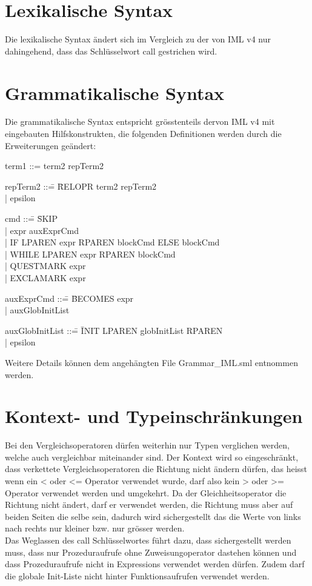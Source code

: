 \documentclass[a4paper,10pt]{article}
\begin{document}
\section{Lexikalische Syntax}
Die lexikalische Syntax \"andert sich im Vergleich zu der von IML v4
nur dahingehend, dass das Schl\"usselwort call gestrichen wird.
\section{Grammatikalische Syntax}
Die grammatikalische Syntax entspricht gr\"osstenteils dervon IML v4 mit eingebauten Hilfskonstrukten, die folgenden Definitionen werden durch die Erweiterungen ge\"andert:

\begin{tabbing}
term1 ::= term2 repTerm2
\end{tabbing}
\begin{tabbing}
repTerm2 ::\= = \= RELOPR term2 repTerm2\\
\> |\> epsilon
\end{tabbing}
\begin{tabbing}
cmd ::\= = \= SKIP\\
\> |\> expr auxExprCmd\\
\> |\> IF LPAREN expr RPAREN blockCmd ELSE blockCmd\\
\> |\> WHILE LPAREN expr RPAREN blockCmd\\
\> |\> QUESTMARK expr\\
\> |\> EXCLAMARK expr\\
\end{tabbing}
\begin{tabbing}
auxExprCmd ::\= = \= BECOMES expr\\
\> |\> auxGlobInitList\\
\end{tabbing}
\begin{tabbing}
auxGlobInitList ::\= = \= INIT LPAREN globInitList RPAREN\\
\> |\> epsilon\\
\end{tabbing}
Weitere Details k\"onnen dem angeh\"angten File Grammar\_IML.sml entnommen werden. 
\section{Kontext- und Typeinschr\"ankungen}
Bei den Vergleichsoperatoren d\"urfen weiterhin nur Typen verglichen werden, welche auch vergleichbar miteinander sind. Der Kontext wird so
eingeschr\"ankt, dass verkettete Vergleichsoperatoren die Richtung nicht \"andern d\"urfen, das heisst wenn ein < oder <= Operator verwendet wurde, darf also kein > oder >= Operator verwendet werden und umgekehrt. Da der Gleichheitsoperator die Richtung nicht \"andert, darf er verwendet werden, die Richtung muss aber auf beiden Seiten die selbe sein, dadurch wird sichergestellt das die Werte von links nach rechts nur kleiner bzw. nur gr\"osser werden.\\
Das Weglassen des call Schl\"usselwortes führt dazu, dass
sichergestellt werden muss, dass nur Prozeduraufrufe ohne 
Zuweisungoperator dastehen k\"onnen und dass Prozeduraufrufe nicht in
Expressions verwendet werden d\"urfen. Zudem darf die globale
Init-Liste nicht hinter Funktionsaufrufen verwendet werden. 
\end{document}
